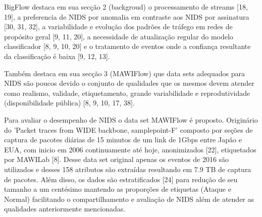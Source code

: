 
BigFlow destaca em sua secção 2 (backgroud) o processamento de streams [18, 19],
a preferencia de NIDS por anomalia em contraste aos NIDS por assinatura [30, 31, 32],
a variabilidade e evolução dos padrões de tráfego em redes de propósito geral [9, 11, 20],
a necessidade de atualização regular do modelo classificador [8, 9, 10, 20] e
o tratamento de eventos onde a confiança resultante da classificação é baixa [9, 12, 13].

Também destaca em sua secção 3 (MAWIFlow) 
que data sets adequados para NIDS são poucos devido o conjunto de qualidades que os mesmos
devem atender como realismo, validade, etiquetamento, grande variabilidade
e reprodutividade (disponibilidade pública) [8, 9, 10, 17, 38].


Para avaliar o desempenho de NIDS o data set MAWIFlow é proposto. Originário do 
'Packet traces from WIDE backbone, samplepoint-F' composto por seções de captura de pacotes
diárias de 15 minutos de um link de 1Gbps entre Japão e EUA, com inicio em 2006 continuamente até hoje,
anonimizados [22], etiquetados por MAWILab [8].
Desse data set original apenas os eventos de 2016 são utilizados e desses 158 atributos são extraídas
resultando em 7.9 TB de captura de pacotes. Além disso, os dados são estratificados [24] para redução
de seu tamanho a um centésimo mantendo as proporções de etiquetas (Ataque e Normal)
facilitando o compartilhamento e avaliação de NIDS além de atender as qualidades anteriormente mencionadas.

